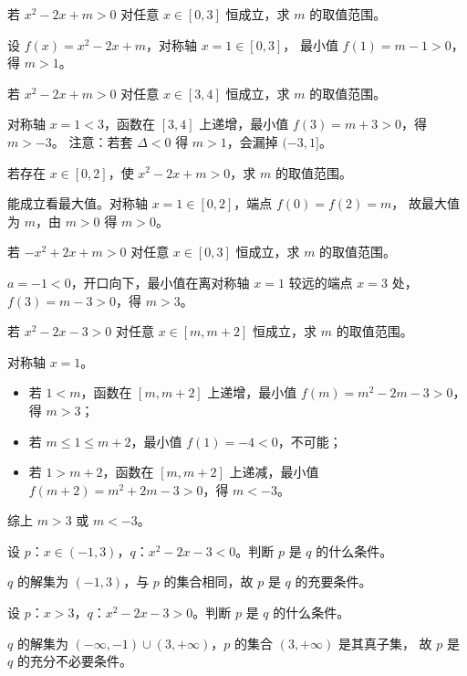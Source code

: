 \begin{problem}
若 $x^2-2x+m>0$ 对任意 $x\in[0,3]$ 恒成立，求 $m$ 的取值范围。
\end{problem}
\begin{solution}
设 $f(x)=x^2-2x+m$，对称轴 $x=1\in[0,3]$，
最小值 $f(1)=m-1>0$，得 $m>1$。
\end{solution}

\begin{problem}
若 $x^2-2x+m>0$ 对任意 $x\in[3,4]$ 恒成立，求 $m$ 的取值范围。
\end{problem}
\begin{solution}
对称轴 $x=1<3$，函数在 $[3,4]$ 上递增，最小值 $f(3)=m+3>0$，得 $m>-3$。
注意：若套 $\Delta<0$ 得 $m>1$，会漏掉 $(-3,1]$。
\end{solution}

\begin{problem}
若存在 $x\in[0,2]$，使 $x^2-2x+m>0$，求 $m$ 的取值范围。
\end{problem}
\begin{solution}
能成立看最大值。对称轴 $x=1\in[0,2]$，端点 $f(0)=f(2)=m$，
故最大值为 $m$，由 $m>0$ 得 $m>0$。
\end{solution}

\begin{problem}
若 $-x^2+2x+m>0$ 对任意 $x\in[0,3]$ 恒成立，求 $m$ 的取值范围。
\end{problem}
\begin{solution}
$a=-1<0$，开口向下，最小值在离对称轴 $x=1$ 较远的端点 $x=3$ 处，
$f(3)=m-3>0$，得 $m>3$。
\end{solution}

\begin{problem}
若 $x^2-2x-3>0$ 对任意 $x\in[m,m+2]$ 恒成立，求 $m$ 的取值范围。
\end{problem}
\begin{solution}
对称轴 $x=1$。
\begin{itemize}
  \item 若 $1<m$，函数在 $[m,m+2]$ 上递增，最小值 $f(m)=m^2-2m-3>0$，得 $m>3$；
  \item 若 $m\leq1\leq m+2$，最小值 $f(1)=-4<0$，不可能；
  \item 若 $1>m+2$，函数在 $[m,m+2]$ 上递减，最小值 $f(m+2)=m^2+2m-3>0$，得 $m<-3$。
\end{itemize}
综上 $m>3$ 或 $m<-3$。
\end{solution}

\begin{problem}
设 $p$：$x\in(-1,3)$，$q$：$x^2-2x-3<0$。判断 $p$ 是 $q$ 的什么条件。
\end{problem}
\begin{solution}
$q$ 的解集为 $(-1,3)$，与 $p$ 的集合相同，故 $p$ 是 $q$ 的充要条件。
\end{solution}

\begin{problem}
设 $p$：$x>3$，$q$：$x^2-2x-3>0$。判断 $p$ 是 $q$ 的什么条件。
\end{problem}
\begin{solution}
$q$ 的解集为 $(-\infty,-1)\cup(3,+\infty)$，$p$ 的集合 $(3,+\infty)$ 是其真子集，
故 $p$ 是 $q$ 的充分不必要条件。
\end{solution}
